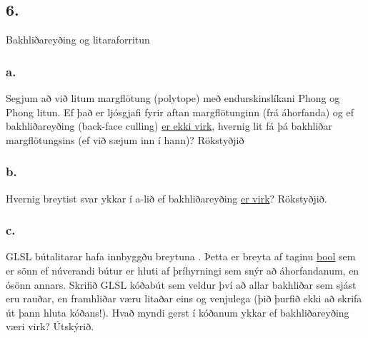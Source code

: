 \documentclass{article}
\begin{document}
\newpage

\subsection{6.} Bakhliðareyðing og litaraforritun

\subsubsection{a.}Segjum að við litum margflötung (polytope) með endurskinslíkani Phong og
Phong litun. Ef það er ljósgjafi fyrir aftan margflötunginn (frá áhorfanda) og
ef bakhliðareyðing (back-face culling) \underline{er ekki virk}, hvernig lit fá þá bakhliðar
margflötungsins (ef við sæjum inn í hann)? Rökstyðjið

\subsubsection{b.}Hvernig breytist svar ykkar í a-lið ef bakhliðareyðing \underline{er virk}? Rökstyðjið.

\subsubsection{c.}GLSL bútalitarar hafa innbyggðu breytuna . Þetta er
breyta af taginu \underline{bool} sem er sönn ef núverandi bútur er hluti af þríhyrningi
sem snýr að áhorfandanum, en ósönn annars. Skrifið GLSL kóðabút sem
veldur því að allar bakhliðar sem sjást eru rauðar, en framhliðar væru litaðar
eins og venjulega (þið þurfið ekki að skrifa út þann hluta kóðans!). Hvað
myndi gerst í kóðanum ykkar ef bakhliðareyðing væri virk? Útskýrið.
\end{document}

